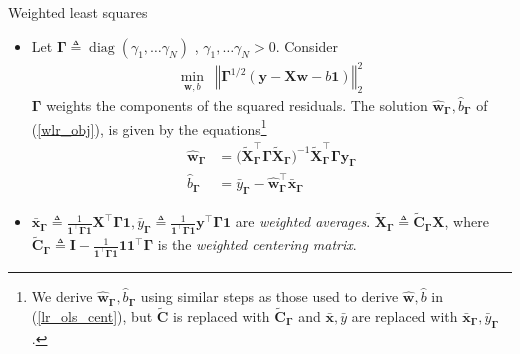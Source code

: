 \documentclass{beamer}
\numberwithin{equation}{section}
\newcommand{\aref}[1]{\alert{\ref{#1}}}
\begin{document}
\begin{frame}{Weighted least squares}
    \begin{itemize}
        \item
        Let $ \mathbf{\Gamma} \triangleq \operatorname{diag}(\gamma_1, \ldots
        \gamma_N)$ , $ \gamma_1, \ldots \gamma_N > 0 $. Consider
        \begin{equation} \label{wlr_obj}
            \begin{array}{ll}
                \displaystyle\min_{\mathbf{w}, b} &
                \left\Vert\mathbf{\Gamma}^{1 / 2}(\mathbf{y} - \mathbf{Xw} - 
                b\mathbf{1})\right\Vert_2^2
            \end{array}
        \end{equation}
        $ \mathbf{\Gamma} $ weights the components of the squared residuals.
        The solution $ \hat{\mathbf{w}}_\mathbf{\Gamma},
        \hat{b}_\mathbf{\Gamma} $ of (\aref{wlr_obj}), is given by the
        equations\footnote{
            We derive $ \hat{\mathbf{w}}_\mathbf{\Gamma},
            \hat{b}_\mathbf{\Gamma} $ using similar steps as those used to
            derive $ \hat{\mathbf{w}}, \hat{b} $ in (\aref{lr_ols_cent}), but
            $ \tilde{\mathbf{C}} $ is replaced with
            $ \tilde{\mathbf{C}}_\mathbf{\Gamma} $ and $ \bar{\mathbf{x}},
            \bar{y} $ are replaced with
            $ \bar{\mathbf{x}}_\mathbf{\Gamma}, \bar{y}_\mathbf{\Gamma} $.
        }
        \begin{equation} \label{wlr_sol}
            \begin{split}
                \hat{\mathbf{w}}_\mathbf{\Gamma} & = \big(
                    \tilde{\mathbf{X}}_\mathbf{\Gamma}^\top
                    \mathbf{\Gamma}\tilde{\mathbf{X}}_\mathbf{\Gamma}
                \big)^{-1}\tilde{\mathbf{X}}_\mathbf{\Gamma}^\top
                \mathbf{\Gamma}\mathbf{y}_\mathbf{\Gamma} \\
                \hat{b}_\mathbf{\Gamma} & = \bar{y}_\mathbf{\Gamma} -
                \hat{\mathbf{w}}_\mathbf{\Gamma}^\top
                \bar{\mathbf{x}}_\mathbf{\Gamma}
            \end{split}
        \end{equation}

        \item
        $ \bar{\mathbf{x}}_\mathbf{\Gamma} \triangleq
        \frac{1}{\mathbf{1}^\top\mathbf{\Gamma 1}}\mathbf{X}^\top
        \mathbf{\Gamma 1}, \bar{y}_\mathbf{\Gamma} \triangleq
        \frac{1}{\mathbf{1}^\top\mathbf{\Gamma 1}}\mathbf{y}^\top
        \mathbf{\Gamma 1} $ are \textit{weighted averages}.
        $ \tilde{\mathbf{X}}_\mathbf{\Gamma} \triangleq
        \tilde{\mathbf{C}}_\mathbf{\Gamma}\mathbf{X} $, where
        $ \tilde{\mathbf{C}}_\mathbf{\Gamma} \triangleq \mathbf{I} -
        \frac{1}{\mathbf{1}^\top\mathbf{\Gamma 1}}
        \mathbf{11}^\top\mathbf{\Gamma} $ is the
        \textit{weighted centering matrix}.
    \end{itemize}
\end{frame}
\end{document}
